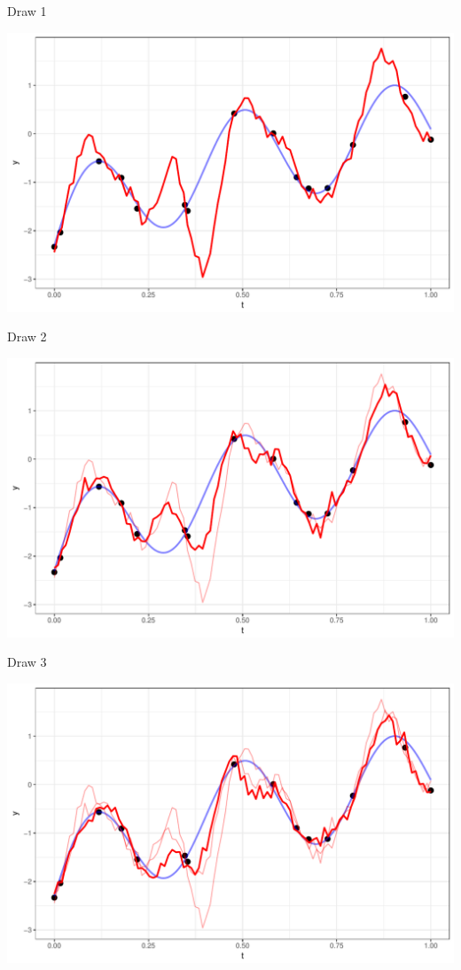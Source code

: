 \documentclass[11pt,ignorenonframetext,]{beamer}
\begin{document}
\begin{frame}{Draw 1}

\includegraphics{Lec12_files/figure-beamer/unnamed-chunk-5-1.pdf}

\end{frame}

\begin{frame}{Draw 2}

\includegraphics{Lec12_files/figure-beamer/unnamed-chunk-6-1.pdf}

\end{frame}

\begin{frame}{Draw 3}

\includegraphics{Lec12_files/figure-beamer/unnamed-chunk-7-1.pdf}

\end{frame}
\end{document}
